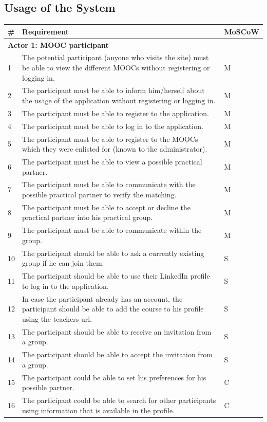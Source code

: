 \subsection{Usage of the System}
\begin{tabular}{ | p{0.5cm} | p{12cm} | p{2cm} | }
\hline
\textbf{\#} & \textbf{Requirement} & \textbf{MoSCoW} \\ \hline
\multicolumn{3}{|p{14.5cm}|}{\textbf{Actor 1: MOOC participant}} \\ \hline
1 & The potential participant (anyone who visits the site) must be able to view the different MOOCs without registering or logging in. & M \\ \hline
2 & The participant must be able to inform him/herself about the usage of the application without registering or logging in. & M \\ \hline
3 & The participant must be able to register to the application. & M \\ \hline
4 & The participant must be able to log in to the application. & M \\ \hline
5 & The participant must be able to register to the MOOCs which they were enlisted for (known to the administrator). & M \\ \hline
6 & The participant must be able to view a possible practical partner. & M \\ \hline
7 & The participant must be able to communicate with the possible practical partner to verify the matching. & M \\ \hline
8 & The participant must be able to accept or decline the practical partner into his practical group. & M \\ \hline
9 & The participant must be able to communicate within the group. & M \\ \hline
10 & The participant should be able to ask a currently existing group if he can join them. & S \\ \hline
11 & The participant should be able to use their LinkedIn profile to log in to the application. & S \\ \hline
12 & In case the participant already has an account, the participant should be able to add the course to his profile using the teachers url. & S \\ \hline
13 & The participant should be able to receive an invitation from a group. & S \\ \hline
14 & The participant should be able to accept the invitation from a group. & S \\ \hline
15 & The participant could be able to set his preferences for his possible partner. & C \\ \hline
16 & The participant could be able to search for other participants using information that is available in the profile. & C \\ \hline
\end{tabular}
